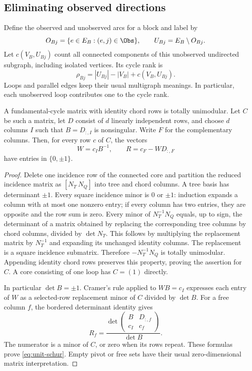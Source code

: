 \subsection{Eliminating observed directions}\label{subsec:observed-directions}
Define the observed and unobserved arcs for a block and label by
\[
 O_{Bj}=\{e\in E_B:(e,j)\in\Obs\},\qquad U_{Bj}=E_B\setminus O_{Bj}.
\]
Let $c(V_B,U_{Bj})$ count all connected components of this unobserved
undirected subgraph, including isolated vertices. Its cycle rank is
\begin{equation}\label{eq:unobserved-rank}
 \rho_{Bj}=|U_{Bj}|-|V_B|+c(V_B,U_{Bj}).
\end{equation}
Loops and parallel edges keep their usual multigraph meanings. In particular,
each unobserved loop contributes one to the cycle rank.

\begin{lemma}\label{lem:cycle-tu}
A fundamental-cycle matrix with identity chord rows is totally unimodular.
Let $C$ be such a matrix, let $D$ consist of $d$ linearly independent rows,
and choose $d$ columns $I$ such that $B=D_{:,I}$ is nonsingular. Write $F$
for the complementary columns. Then, for every row $c$ of $C$, the vectors
\begin{equation}\label{eq:unit-schur}
 W=c_I B^{-1},\qquad R=c_F-WD_{:,F}
\end{equation}
have entries in $\{0,\pm1\}$.
\end{lemma}
\begin{proof}
Delete one incidence row of the connected core and partition the reduced
incidence matrix as $[N_T\ N_Q]$ into tree and chord columns. A tree
basis has determinant $\pm1$. Every square incidence minor is $0$ or
$\pm1$: induction expands a column with at most one nonzero entry; if
every column has two entries, they are opposite and the row sum is zero.
Every minor of $N_T^{-1}N_Q$ equals, up to sign, the determinant of a
matrix obtained by replacing the corresponding tree columns by chord
columns, divided by $\det N_T$. This follows by multiplying the replacement
matrix by $N_T^{-1}$ and expanding its unchanged identity columns.
The replacement is a square incidence submatrix. Therefore
$-N_T^{-1}N_Q$ is totally unimodular. Appending identity chord rows
preserves this property, proving the assertion for $C$. A core consisting
of one loop has $C=(1)$ directly.

In particular $\det B=\pm1$. Cramer's rule applied to $WB=c_I$ expresses
each entry of $W$ as a selected-row replacement minor of $C$ divided by
$\det B$. For a free column $f$, the bordered determinant identity gives
\[
 R_f=\frac{\det\begin{pmatrix}B&D_{:,f}\\c_I&c_f\end{pmatrix}}
                  {\det B}.
\]
The numerator is a minor of $C$, or zero when its rows repeat. These
formulas prove \eqref{eq:unit-schur}. Empty pivot or free sets have their
usual zero-dimensional matrix interpretation.
\end{proof}

